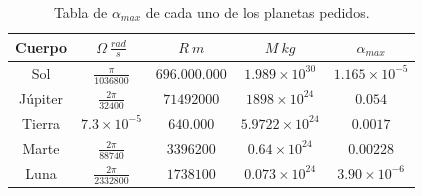 \begin{enumerate}
      \begin{table}[h]
        \centering
        \caption{Tabla de $\alpha_{max}$ de cada uno de los planetas pedidos.}
        \label{tab:alpha}
        \begin{tabular}{|c|c|c|c|c|}
	  \hline
	  Cuerpo & $\Omega\ \frac{rad}{s}$ & $R\ m$ &  $M\ kg$ & $\alpha_{max}$\\
	  \hline
	  Sol & $\frac{\pi}{1036800}$ & $696.000.000$ & $1.989\times 10^{30}$ & $1.165\times 10^{-5}$ \\
	  Júpiter & $\frac{2\pi}{32400}$ & $71492000$ & $1898\times 10^{24}$ & $0.054$ \\
	Tierra & $7.3\times 10^{-5}$ & $640.000$ & $5.9722\times 10^{24}$ & $0.0017$ \\
	Marte & $\frac{2\pi}{88740}$ & $3396200$ & $0.64\times 10^{24}$ & $0.00228$ \\
	Luna & $\frac{2\pi}{2332800}$ & $1738100$ & $0.073\times 10^{24}$ & $3.90\times 10^{-6}$\\
	\hline
        \end{tabular}
      \end{table}


\end{enumerate}
